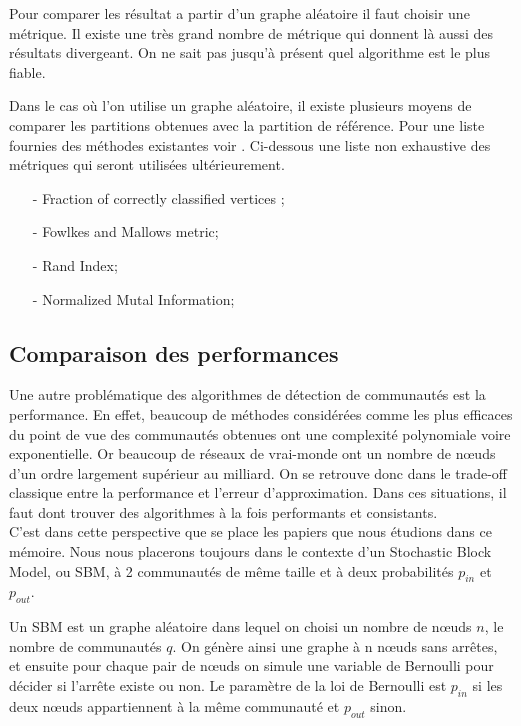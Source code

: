 Pour comparer les résultat a partir d'un graphe aléatoire il faut choisir une métrique.
Il existe une très grand nombre de métrique qui donnent là aussi des résultats divergeant.
On ne sait pas jusqu'à présent quel algorithme est le plus fiable.

Dans le cas où l'on utilise un graphe aléatoire, il existe plusieurs moyens de comparer les partitions obtenues avec la partition de référence.  
Pour une liste fournies des méthodes existantes voir \cite[p.77-79]{Community_detection_in_graphs}.
Ci-dessous une liste non exhaustive des métriques qui seront utilisées ultérieurement.
\begin{itemize}
	\item[-] Fraction of correctly classified vertices ; 
	\item[-] Fowlkes and Mallows metric; 
	\item[-] Rand Index; 
	\item[-] Normalized Mutal Information; 
\end{itemize}

\subsection{Comparaison des performances}
Une autre problématique des algorithmes de détection de communautés est la performance.
En effet, beaucoup de méthodes considérées comme les plus efficaces du point de vue des communautés obtenues ont une complexité polynomiale voire exponentielle.
Or beaucoup de réseaux de vrai-monde ont un nombre de nœuds d'un ordre largement supérieur au milliard. 
On se retrouve donc dans le trade-off classique entre la performance et l'erreur d'approximation. 
Dans ces situations, il faut dont trouver des algorithmes à la fois performants et consistants.\\

C'est dans cette perspective que se place les papiers que nous étudions dans ce mémoire.
Nous nous placerons toujours dans le contexte d'un Stochastic Block Model, ou SBM, à 2 communautés de même taille et à deux probabilités $p_{in}$ et $p_{out}$.

Un SBM est un graphe aléatoire dans lequel on choisi un nombre de nœuds $n$, le nombre de communautés $q$. 
On génère ainsi une graphe à n nœuds sans arrêtes, et ensuite pour chaque pair de nœuds on simule une variable de Bernoulli pour décider si l’arrête existe ou non.
Le paramètre de la loi de Bernoulli est $p_{in}$ si les deux nœuds appartiennent à la même communauté et $p_{out}$ sinon.

